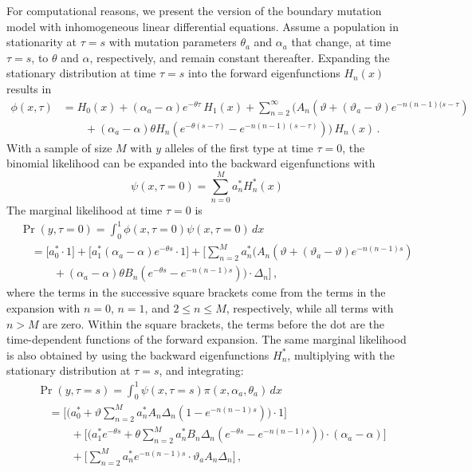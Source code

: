 \documentclass[preprint]{elsarticle}
\begin{document}
For computational reasons, we present the version of the boundary mutation model with inhomogeneous linear differential equations. Assume a population in stationarity at $\tau=s$ with mutation parameters $\theta_a$ and $\alpha_a$ that change, at time $\tau=s$, to $\theta$ and $\alpha$, respectively, and remain constant thereafter. 
Expanding the stationary distribution at time $\tau=s$ into the forward eigenfunctions $H_n(x)$ results in
\begin{equation}
\begin{split}
    \phi(x,\tau)&= H_0(x)+(\alpha_a-\alpha) e^{-\theta \tau}\,H_1(x)+\sum_{n=2}^\infty \bigg(A_n(\vartheta+(\vartheta_a-\vartheta) e^{-n(n-1)(s-\tau})\\
    &\qquad+(\alpha_a-\alpha) \theta H_n (e^{-\theta (s-\tau)}-e^{-n(n-1) (s-\tau)})\bigg)\,H_n(x)\,.
\end{split}
\end{equation}
With a sample of size $M$ with $y$ alleles of the first type at time $\tau=0$, the binomial likelihood can be expanded into the backward eigenfunctions with 
\begin{equation}
    \psi(x,\tau=0)=\sum_{n=0}^M a_n^{*} H_n^{*}(x)
\end{equation}
The marginal likelihood at time $\tau=0$ is
\begin{equation}
\begin{split}
    &\Pr(y,\tau=0)=\int_0^1 \phi(x,\tau=0)\psi(x,\tau=0)\,dx\\
    &\quad=\bigg[a_0^{*}\cdot 1\bigg]+\bigg[a_1^{*}(\alpha_a-\alpha) e^{-\theta s}\cdot 1\bigg]+\bigg[\sum_{n=2}^M a_n^{*}\bigg(A_n(\vartheta+(\vartheta_a-\vartheta) e^{-n(n-1)s}) \\
    &\quad\qquad+(\alpha_a-\alpha)\theta B_n (e^{-\theta s}-e^{-n(n-1) s})\bigg)\cdot\Delta_n\bigg]\,,\
\end{split}
\end{equation}
where the terms in the successive square brackets come from the terms in the expansion with $n=0$, $n=1$, and $2\leq n\leq M$, respectively, while all terms with $n>M$ are zero. Within the square brackets, the terms before the dot are the time-dependent functions of the forward expansion. The same marginal likelihood is also obtained by using the backward eigenfunctions $H_n^{*}$, multiplying with the stationary distribution at $\tau=s$, and integrating:
\begin{equation}
\begin{split}
    &\Pr(y,\tau=s)=\int_0^1 \psi(x,\tau=s)\pi(x,\alpha_a,\theta_a)\,dx\\
    &\quad=\bigg[\bigg(a_0^{*}+\vartheta\sum_{n=2}^M a_n^{*}A_n\Delta_n  (1-e^{-n(n-1)s})\bigg)\cdot 1\bigg]\\ &\quad\qquad+\bigg[\bigg(a_1^{*} e^{-\theta s}+\theta\sum_{n=2}^M a_n^{*}B_n\Delta_n(e^{-\theta s}- e^{-n(n-1)s})\bigg)\cdot (\alpha_a-\alpha)\bigg]\\
    &\quad\qquad+\bigg[\sum_{n=2}^M a_n^{*} e^{-n(n-1)s}\cdot \vartheta_a A_n\Delta_n\bigg]\,,
\end{split}
\end{equation}
\end{document}
